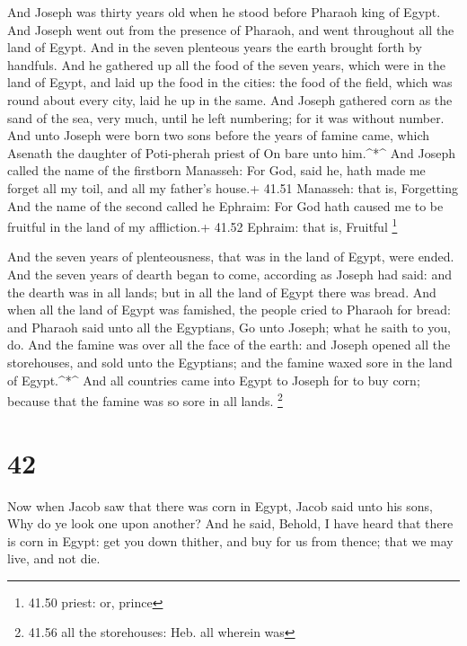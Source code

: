  And Joseph was thirty years old when he stood before
Pharaoh king of Egypt. And Joseph went out from the presence of Pharaoh,
and went throughout all the land of Egypt.  And in the
seven plenteous years the earth brought forth by handfuls. 
And he gathered up all the food of the seven years, which were in the
land of Egypt, and laid up the food in the cities: the food of the
field, which was round about every city, laid he up in the same.
 And Joseph gathered corn as the sand of the sea, very
much, until he left numbering; for it was without number. 
And unto Joseph were born two sons before the years of famine came,
which Asenath the daughter of Poti-pherah priest of On bare unto
him.\^{}*\^{}  And Joseph called the name of the firstborn
Manasseh: For God, said he, hath made me forget all my toil, and all my
father's house.+ 41.51 Manasseh: that is, Forgetting  And
the name of the second called he Ephraim: For God hath caused me to be
fruitful in the land of my affliction.+ 41.52 Ephraim: that is, Fruitful
\footnote{41.50 priest: or, prince}

 And the seven years of plenteousness, that was in the land
of Egypt, were ended.  And the seven years of dearth began
to come, according as Joseph had said: and the dearth was in all lands;
but in all the land of Egypt there was bread.  And when all
the land of Egypt was famished, the people cried to Pharaoh for bread:
and Pharaoh said unto all the Egyptians, Go unto Joseph; what he saith
to you, do.  And the famine was over all the face of the
earth: and Joseph opened all the storehouses, and sold unto the
Egyptians; and the famine waxed sore in the land of Egypt.\^{}*\^{}
 And all countries came into Egypt to Joseph for to buy
corn; because that the famine was so sore in all lands. \footnote{41.56
  all the storehouses: Heb. all wherein was}

\hypertarget{section-41}{%
\section{42}\label{section-41}}

 Now when Jacob saw that there was corn in Egypt, Jacob said
unto his sons, Why do ye look one upon another?  And he
said, Behold, I have heard that there is corn in Egypt: get you down
thither, and buy for us from thence; that we may live, and not die.

